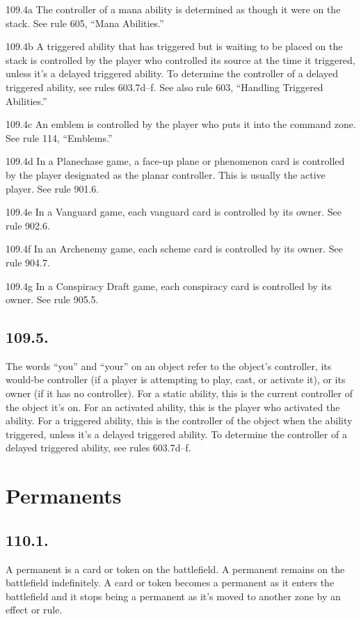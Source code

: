 109.4a The controller of a mana ability is determined as though it were on the stack. See rule 605, “Mana Abilities.”

109.4b A triggered ability that has triggered but is waiting to be placed on the stack is controlled by the player who controlled its source at the time it triggered, unless it’s a delayed triggered ability. To determine the controller of a delayed triggered ability, see rules 603.7d–f. See also rule 603, “Handling Triggered Abilities.”

109.4c An emblem is controlled by the player who puts it into the command zone. See rule 114, “Emblems.”

109.4d In a Planechase game, a face-up plane or phenomenon card is controlled by the player designated as the planar controller. This is usually the active player. See rule 901.6.

109.4e In a Vanguard game, each vanguard card is controlled by its owner. See rule 902.6.

109.4f In an Archenemy game, each scheme card is controlled by its owner. See rule 904.7.

109.4g In a Conspiracy Draft game, each conspiracy card is controlled by its owner. See rule 905.5.

\subsection*{109.5.}
The words “you” and “your” on an object refer to the object’s controller, its would-be controller (if a player is attempting to play, cast, or activate it), or its owner (if it has no controller). For a static ability, this is the current controller of the object it’s on. For an activated ability, this is the player who activated the ability. For a triggered ability, this is the controller of the object when the ability triggered, unless it’s a delayed triggered ability. To determine the controller of a delayed triggered ability, see rules 603.7d–f.

\section{Permanents}
\subsection*{110.1.}
A permanent is a card or token on the battlefield. A permanent remains on the battlefield indefinitely. A card or token becomes a permanent as it enters the battlefield and it stops being a permanent as it’s moved to another zone by an effect or rule.

